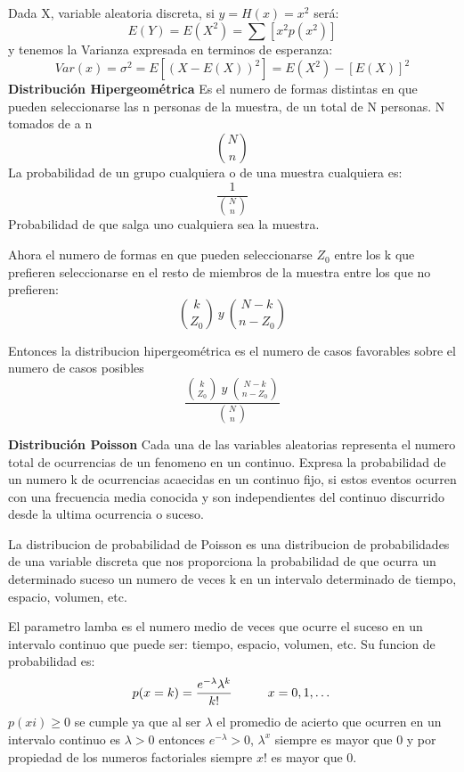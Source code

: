 \documentclass[10pt,a4paper]{article}
\begin{document}
Dada X, variable aleatoria discreta, si $y=H(x)=x^2$ será:
\begin{equation}
	E(Y)=E(X^2)=\sum \left[x^2p(x^2)\right]
\end{equation}
y tenemos la Varianza expresada en terminos de esperanza:
\begin{equation}
	Var(x)=\sigma^2=E\left[(X-E(X))^2\right]=E(X^2)-\left[E(X)\right]^2
\end{equation}
\textbf{Distribución Hipergeométrica}
Es el numero de formas distintas en que pueden seleccionarse las n personas de la muestra, de un total de N personas. N tomados de a n
\begin{equation}
	{N\choose n}
\end{equation}
La probabilidad de un grupo cualquiera o de una muestra cualquiera es:
\begin{equation}
	\frac{1}{{N\choose n}}
\end{equation}
Probabilidad de que salga uno cualquiera sea la muestra.

Ahora el numero de formas en que pueden seleccionarse $Z_0$ entre los k que prefieren seleccionarse en el resto de miembros de la muestra entre los que no prefieren:
\begin{equation}
	{k\choose Z_0}\ y \ {{N-k}\choose{n-Z_0}}
\end{equation}

Entonces la distribucion hipergeométrica es el numero de casos favorables sobre el numero de casos posibles
\begin{equation}
	\frac{{k\choose Z_0}\ y \ {{N-k}\choose{n-Z_0}}}{{N\choose n}}
\end{equation}

\textbf{Distribución Poisson}
Cada una de las variables aleatorias representa el numero total de ocurrencias de un fenomeno en un continuo. Expresa la probabilidad de un numero k de ocurrencias acaecidas en un continuo fijo, si estos eventos ocurren con una frecuencia media conocida y son independientes del continuo discurrido desde la ultima ocurrencia o suceso.

La distribucion de probabilidad de Poisson es una distribucion de probabilidades de una variable discreta que nos proporciona la probabilidad de que ocurra un determinado suceso un numero de veces k en un intervalo determinado de tiempo, espacio, volumen, etc.

El parametro lamba es el numero medio de veces que ocurre el suceso en un intervalo continuo que puede ser: tiempo, espacio, volumen, etc. Su funcion de probabilidad es:
\begin{equation}
	p(x=k)=\frac{e^{-\lambda}\lambda^k}{k!} \hspace{10mm} x=0,1,\dots
\end{equation}
$p(xi)\geq 0$ se cumple ya que al ser $\lambda$ el promedio de acierto que ocurren en un intervalo continuo es $\lambda>0$ entonces $e^{-\lambda}>0$, $\lambda^x$ siempre es mayor que 0 y por propiedad de los numeros factoriales siempre $x!$ es mayor que 0.
\end{document}
